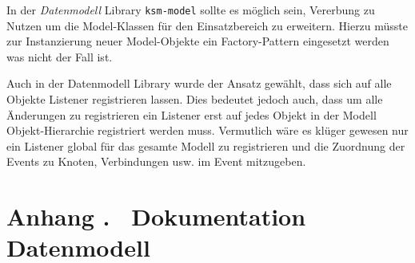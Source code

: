 \documentclass[%
12pt,titlepage,abstracton,DIV=10,BCOR=0.5cm]{scrreprt}
\begin{document}
In der \emph{Datenmodell} Library \texttt{ksm-model} sollte es möglich sein,
Vererbung zu Nutzen um die Model-Klassen für den Einsatzbereich zu erweitern. Hierzu
müsste zur Instanzierung neuer Model-Objekte ein Factory-Pattern
eingesetzt werden was nicht der Fall ist.

Auch in der Datenmodell Library wurde der Ansatz gewählt, dass sich auf alle
Objekte Listener registrieren lassen. Dies bedeutet jedoch auch, dass um alle
Änderungen zu registrieren ein Listener erst auf jedes Objekt in der Modell
Objekt-Hierarchie registriert werden muss. Vermutlich wäre es klüger gewesen nur
ein Listener global für das gesamte Modell zu registrieren und die Zuordnung der
Events zu Knoten, Verbindungen usw. im Event mitzugeben.

\vspace{1cm}







\cleardoublepage
\appendix
{}
\label{appendix}
\setcounter{section}{0}

\cleardoublepage
\addtocounter{section}{1}
\chapter*{Anhang . \ Dokumentation Datenmodell}
\label{chapter:doku-datamodel}

\end{document}
